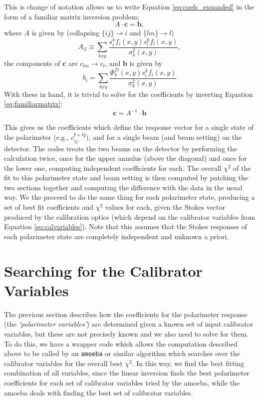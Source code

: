 \documentclass[11pt]{article}
\begin{document}
This is change of notation allows us to write Equation \ref{eq:coefs_expanded} in the form of a familiar matrix inversion problem:
\begin{equation}\label{eq:familiarmatrix}
	A\cdot \mathbf{c} = \mathbf{b},
\end{equation}
where $A$ is given by (collapsing $\{ij\}\rightarrow i$ and $\{lm\}\rightarrow l$)
\begin{equation}
	A_{il} \equiv \sum_{kxy}\frac{s^k_i f_i(x,y) s^k_l f_l(x,y)}{\sigma^2_k(x,y)},
\end{equation}
the components of $\mathbf{c}$ are $c_{lm}\rightarrow c_l$, and $\mathbf{b}$ is given by
\begin{equation}
	b_i = \sum_{kxy}\frac{\Phi^D_k(x,y) s^k_i f_i(x,y)}{\sigma^2_k(x,y)}
\end{equation}
With these in hand, it is trivial to solve for the coefficients by inverting Equation \ref{eq:familiarmatrix}:
\begin{equation}
	\mathbf{c} = A^{-1}\cdot\mathbf{b}
\end{equation}

This gives us the coefficients which define the response vector for a single state of the polarimeter (e.g., $c^{\mathrm{I+Q}}_{ij})$, and for a single beam (and beam setting) on the detector. The codes treats the two beams on the detector by performing the calculation twice, once for the upper annulus (above the diagonal) and once for the lower one, computing independent coefficients for each. The overall $\chi^2$ of the fit to this polarimeter state and beam setting is then computed by patching the two sections together and computing the difference with the data in the usual way. We the proceed to do the same thing for each polarimeter state, producing a set of best fit coefficients and $\chi^2$ values for each, given the Stokes vector produced by the calibration optics (which depend on the calibrator variables from Equation \ref{eq:calvariables}). Note that this assumes that the Stokes responses of each polarimeter state are completely independent and unknown a priori.

\section{Searching for the Calibrator Variables}

The previous section describes how the coefficients for the polarimeter response (the {\em `polarimeter variables'}) are determined given a known set of input calibrator variables, but these are not precisely known and we also need to solve for them. To do this, we have a wrapper code which allows the computation described above to be called by an \texttt{amoeba} or similar algorithm which searches over the calibrator variables for the overall best $\chi^2$. In this way, we find the best fitting combination of all variables, since the linear inversion finds the best polarimeter coefficients for each set of calibrator variables tried by the amoeba, while the amoeba deals with finding the best set of calibrator variables. 
\end{document}
